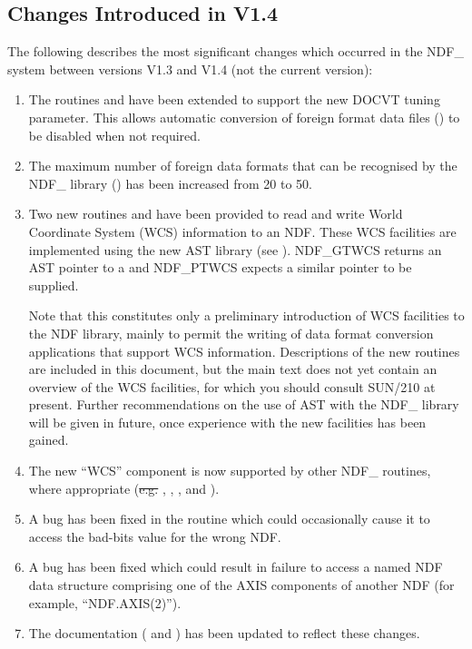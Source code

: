 \subsection{Changes Introduced in V1.4}

The following describes the most significant changes which occurred in
the NDF\_ system between versions V1.3 and V1.4 (not the current
version):

\begin{enumerate}

\item The routines  and
 have been extended to support the new
DOCVT tuning parameter. This allows automatic conversion of foreign
format data files () to be disabled when not
required.

\item The maximum number of foreign data formats that can be
recognised by the NDF\_ library () has been
increased from 20 to 50.

\item Two new routines  and
 have been provided to read and write
World Coordinate System (WCS) information to an NDF. These WCS
facilities are implemented using the new AST library (see
).  NDF\_GTWCS returns an AST pointer to a
 and NDF\_PTWCS expects a similar
pointer to be supplied.

Note that this constitutes only a preliminary introduction of WCS
facilities to the NDF library, mainly to permit the writing of data
format conversion applications that support WCS information.
Descriptions of the new routines are included in this document, but
the main text does not yet contain an overview of the WCS facilities,
for which you should consult SUN/210 at present. Further
recommendations on the use of AST with the NDF\_ library will be given
in future, once experience with the new facilities has been gained.

\item The new ``WCS'' component is now supported by other NDF\_
routines, where appropriate (\st{e.g.\/}
, ,
,  and
).

\item A bug has been fixed in the 
routine which could occasionally cause it to access the bad-bits value
for the wrong NDF.

\item A bug has been fixed which could result in failure to access a
named NDF data structure comprising one of the AXIS components of
another NDF (for example, ``NDF.AXIS(2)'').

\item The documentation ( and
) has been updated to reflect these changes.

\end{enumerate}

